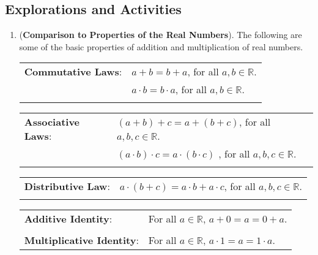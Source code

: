 \subsection*{Explorations and Activities}
\setcounter{oldenumi}{\theenumi}
\begin{enumerate} \setcounter{enumi}{\theoldenumi}
  \item (\textbf{Comparison to Properties of the Real Numbers}).  
The following are some of the basic properties of addition and multiplication of real numbers.

\begin{flushleft}
\begin{tabular}{p{1.6in} p{2.65in}}
\textbf{Commutative Laws}:
\index{commutative laws!for real numbers}%
  &  $a+b=b+a$, for all $a,b \in \mathbb{R}$. \\
                   &  $a \cdot b=b \cdot a$, for all $a,b \in \mathbb{R}$. \\
                   &                \\
\end{tabular}
\begin{tabular}{p{1.6in} p{2.75in}}
\textbf{Associative Laws}:
\index{associative laws!for real numbers}%
     &  $\left( {a + b} \right) + c = a + \left( {b + c} \right)$, for all  $a,b,c \in \mathbb{R}$.  \\
                   &  $\left( {a \cdot b} \right) \cdot c = a \cdot \left( {b \cdot c} \right)$
, for all  $a,b,c \in \mathbb{R}$.  \\
                   &  \\
\end{tabular}
\begin{tabular}{p{1.6in} p{2.65in}}
\textbf{Distributive Law}:
\index{distributive laws!for real numbers}%
  &  $a \cdot \left( {b + c} \right) = a \cdot b + a \cdot c$, for all  $a,b,c \in \mathbb{R}$.  \\
                   & \\
\end{tabular}
\begin{tabular}{p{1.6in} p{2.65in}}
\textbf{Additive Identity}:
\index{additive identity}%
 &  For all  $a \in \mathbb{R}$, $a + 0 = a = 0 + a$.  \\
                  &  \\
\textbf{Multiplicative Identity}:
\index{multiplicative identity}%
  &  For all  $a \in \mathbb{R}$, $a \cdot 1 = a = 1 \cdot a$.  \\

\end{tabular}
\end{flushleft}
\end{enumerate}
